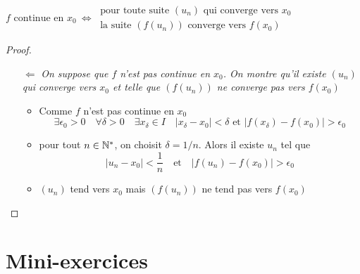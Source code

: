 \begin{frame} 

\centerline{$f \text{ continue en } x_0 \ \iff \
\begin{matrix}
\text{pour toute suite $(u_n)$ qui converge vers } x_0\\
\text{la suite $(f(u_n))$ converge vers } f(x_0)
\end{matrix}$}



\begin{proof}  \pause
\begin{itemize}
  \item[$\Longleftarrow$] \emph{On suppose que $f$ n'est pas continue en $x_0$. 
  On montre qu'il existe $(u_n)$ qui converge vers $x_0$ et 
  telle que $(f(u_n))$ ne converge pas vers $f(x_0)$} 

  \pause 
  \begin{itemize}
  \item Comme $f$ n'est pas continue en $x_0$ 
\[
\exists \epsilon_0>0 \quad \forall\delta>0 \quad \exists x_\delta \in I \quad |x_\delta-x_0|<\delta \text{ et } |f(x_\delta)-f(x_0)|>\epsilon_0
\]
\pause
  \item pour tout $n\in \mathbb{N}^*$, 
on choisit $\delta=1/n$. \pause Alors il existe $u_n$ tel que 
\[
|u_n-x_0|<\frac1n \quad \text{et} \quad |f(u_n)-f(x_0)|>\epsilon_0
\] 
\pause
  \item $(u_n)$ tend vers $x_0$ mais $(f(u_n))$ ne tend pas vers $f(x_0)$

  \end{itemize}
\end{itemize}
\end{proof}

  
\end{frame}



\section{Mini-exercices}

